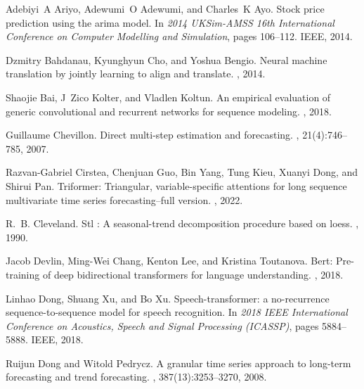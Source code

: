 \documentclass[10pt,twocolumn,letterpaper]{article}
\begin{document}
 \begin{thebibliography}{10}\itemsep=-1pt

Adebiyi~A Ariyo, Adewumi~O Adewumi, and Charles~K Ayo.
\newblock Stock price prediction using the arima model.
\newblock In {\em 2014 UKSim-AMSS 16th International Conference on Computer
  Modelling and Simulation}, pages 106--112. IEEE, 2014.

Dzmitry Bahdanau, Kyunghyun Cho, and Yoshua Bengio.
\newblock Neural machine translation by jointly learning to align and
  translate.
, 2014.

Shaojie Bai, J~Zico Kolter, and Vladlen Koltun.
\newblock An empirical evaluation of generic convolutional and recurrent
  networks for sequence modeling.
, 2018.

Guillaume Chevillon.
\newblock Direct multi-step estimation and forecasting.
, 21(4):746--785, 2007.

Razvan-Gabriel Cirstea, Chenjuan Guo, Bin Yang, Tung Kieu, Xuanyi Dong, and
  Shirui Pan.
\newblock Triformer: Triangular, variable-specific attentions for long sequence
  multivariate time series forecasting--full version.
, 2022.

R.~B. Cleveland.
\newblock Stl : A seasonal-trend decomposition procedure based on loess.
, 1990.

Jacob Devlin, Ming-Wei Chang, Kenton Lee, and Kristina Toutanova.
\newblock Bert: Pre-training of deep bidirectional transformers for language
  understanding.
, 2018.

Linhao Dong, Shuang Xu, and Bo Xu.
\newblock Speech-transformer: a no-recurrence sequence-to-sequence model for
  speech recognition.
\newblock In {\em 2018 IEEE International Conference on Acoustics, Speech and
  Signal Processing (ICASSP)}, pages 5884--5888. IEEE, 2018.

Ruijun Dong and Witold Pedrycz.
\newblock A granular time series approach to long-term forecasting and trend
  forecasting.
,
  387(13):3253--3270, 2008.


\end{thebibliography}
\end{document}
